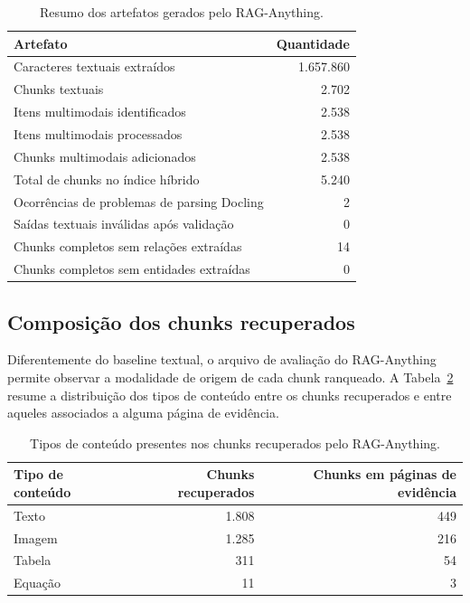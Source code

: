 \begin{table}[htbp]
\centering
\caption{Resumo dos artefatos gerados pelo RAG-Anything.}
\label{tab:artefatos-raganything}
\small
\begin{tabular}{p{7.4cm}r}
\toprule
\textbf{Artefato} & \textbf{Quantidade} \\
\midrule
Caracteres textuais extraídos & 1.657.860 \\
Chunks textuais & 2.702 \\
Itens multimodais identificados & 2.538 \\
Itens multimodais processados & 2.538 \\
Chunks multimodais adicionados & 2.538 \\
Total de chunks no índice híbrido & 5.240 \\
Ocorrências de problemas de parsing Docling & 2 \\
Saídas textuais inválidas após validação & 0 \\
Chunks completos sem relações extraídas & 14 \\
Chunks completos sem entidades extraídas & 0 \\
\bottomrule
\end{tabular}
\end{table}

\subsection{Composição dos chunks recuperados}
\label{subsec:raganything-tipos-conteudo}

Diferentemente do baseline textual, o arquivo de avaliação do RAG-Anything permite observar a modalidade de origem de cada chunk ranqueado. A Tabela~\ref{tab:tipos-conteudo-raganything} resume a distribuição dos tipos de conteúdo entre os chunks recuperados e entre aqueles associados a alguma página de evidência.

\begin{table}[htbp]
\centering
\caption{Tipos de conteúdo presentes nos chunks recuperados pelo RAG-Anything.}
\label{tab:tipos-conteudo-raganything}
\small
\begin{tabular}{l r r}
\toprule
\textbf{Tipo de conteúdo} & \textbf{Chunks recuperados} & \textbf{Chunks em páginas de evidência} \\
\midrule
Texto & 1.808 & 449 \\
Imagem & 1.285 & 216 \\
Tabela & 311 & 54 \\
Equação & 11 & 3 \\
\bottomrule
\end{tabular}
\end{table}

